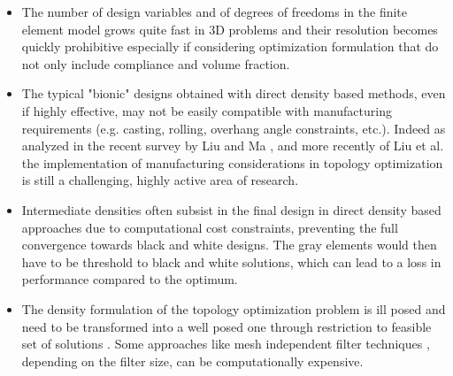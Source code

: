      \begin{itemize} 
   \item The number of design variables and of degrees of freedoms in the finite element model grows quite fast in 3D problems and their resolution becomes quickly prohibitive especially if considering optimization formulation that do not only include compliance and volume fraction. \item The typical "bionic" designs obtained with direct density based methods, even if highly effective, may not be easily compatible with manufacturing requirements (e.g. casting, rolling, overhang angle constraints, etc.). Indeed as analyzed in the recent survey by Liu and Ma \cite{liu2016survey}, and more recently of Liu et al. \cite{liu_current_2018} the implementation of manufacturing considerations in topology optimization is still a challenging, highly active area of research.  
   \item Intermediate densities often subsist in the final design in direct density based approaches due to computational cost constraints, preventing the full convergence towards black and white designs. The gray elements would then have to be threshold to black and white solutions, which can lead to a loss in performance compared to the optimum.  
   \item The density formulation of the topology optimization problem is ill posed and need to be transformed into a well posed one through restriction to feasible set of solutions \cite{borrvall2001topology}. Some approaches like mesh independent filter techniques \cite{sigmund1994design}, depending on the filter size, can be computationally expensive.
   \end{itemize}

